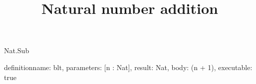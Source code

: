 \begin{lexlean}{Nat.Sub}
\title{Natural number addition}
\begin{semanticmodule}
definition{name: blt, parameters: [n : Nat], result: Nat, body: (n + 1), executable: true}
\end{semanticmodule}
\end{lexlean}
